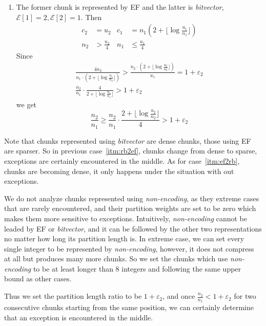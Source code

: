 \documentclass[runningheads,a4paper]{llncs}
\begin{document}
\begin{enumerate}
\item \label{itm:ef2rb}
The former chunk is represented by EF and the latter is \textit{bitvector},$ \mathcal{E}[1]= 2, \mathcal{E}[2]=1 $.
Then
\begin{align*}
c_2 & = u_2 & c_1 & = n_1(2+\lfloor \log \frac{u_1}{n_1} \rfloor)\\ 
n_2 & > \frac{u_2}{4} & n_1 & \leq \frac{u_1}{4}
\end{align*}
Since
\begin{gather*}
\frac{4 n_2}{n_1 \cdot (2+\lfloor \log \frac{u_1}{n_2} \rfloor)} > \frac{n_2 \cdot (2+\lfloor \log \frac{u_2}{n_2} \rfloor)}{u_1} = 1 + \varepsilon_2 \\
\frac{n_2}{n_1} \cdot \frac{4}{2+\lfloor \log \frac{u_1}{n_1} \rfloor} > 1 + \varepsilon_2
\end{gather*}
we get
\[
\frac{n_2}{n_1} \geq \frac{n_2}{n_1} \cdot \frac{2+\lfloor \log \frac{u_2}{n_2} \rfloor}{4} > 1 + \varepsilon_2
\]
\end{enumerate}

Note that chunks represented using \textit{bitvector} are dense chunks, those using EF are sparser.
So in previous case~\ref{itm:rb2ef}, chunks change from dense to sparse, exceptions are certainly encountered in the middle.
As for case~\ref{itm:ef2rb}, chunks are becoming dense, it only happens under the situation with out exceptions.

We do not analyze chunks represented using \textit{non-encoding}, as they extreme cases that are rarely encountered, and their partition weights are set to be zero which makes them more sensitive to exceptions.
Intuitively, \textit{non-encoding} cannot be leaded by EF or \textit{bitvector}, and it can be followed by the other two representations no matter how long its partition length is.
In extreme case, we can set every single integer to be represented by \textit{non-encoding}, however, it does not compress at all but produces many more chunks.
So we set the chunks which use \textit{non-encoding} to be at least longer than 8 integers and following the same upper bound as other cases.

Thus we set the partition length ratio to be $ 1+\varepsilon_2 $, and once $ \frac{n_2}{n_1} < 1+ \varepsilon_2 $ for two consecutive chunks starting from the same position, we can certainly determine that an exception is encountered in the middle.
\end{document}
